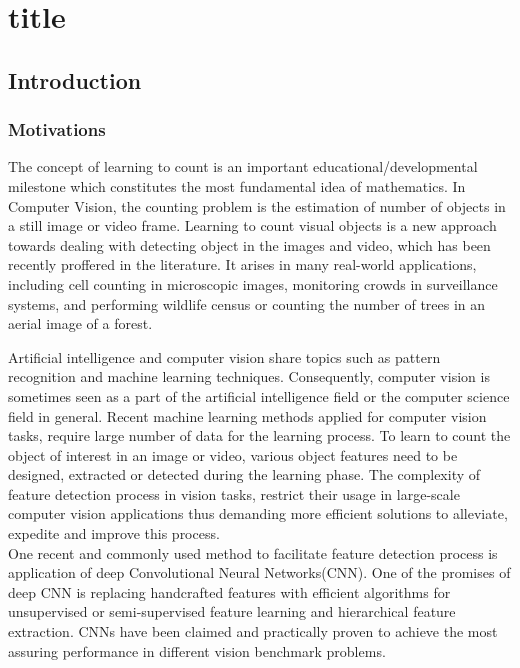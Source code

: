 \part{title}\chapter{Introduction}
\label{sec:introduction}
\section{Motivations}
The concept of learning to count is an important educational/developmental milestone  which constitutes the most fundamental idea of mathematics. In Computer Vision\cite{umbaugh1997computer}, the counting problem is the estimation of number of objects in a still image or video frame. Learning to count visual objects is a new approach towards dealing with detecting object in the images and video, which has been recently proffered in the literature\cite{viola2005detecting, rabaud2006counting, kong2005counting, chan2008privacy, segui2015learning}. It arises in many real-world applications, including cell counting in microscopic images\cite{flaccavento2011learning}, monitoring crowds in surveillance systems\cite{rahmalan2006crowd, valera2005intelligent}, and performing wildlife census or counting the number of trees in an aerial image of a forest\cite{brandtberg1998automated, pollock1996automatic}\cite{NIPS2010_4043}. 

Artificial intelligence and computer vision share topics such as pattern recognition and machine learning\cite{michalski2013machine, mitchell1997machine} techniques. Consequently, computer vision is sometimes seen as a part of the artificial intelligence field or the computer science field in general. Recent machine learning methods applied for computer vision tasks, require large number of data for the learning process. To learn to count the object of interest in an image or video, various object features need to be designed, extracted or detected during the learning phase. The complexity of feature detection process in vision tasks, restrict their usage in large-scale computer vision applications thus demanding more efficient solutions to alleviate, expedite and improve this process. \\
\indent One recent and commonly used method to facilitate feature detection process is application of deep Convolutional Neural Networks(CNN)\cite{szegedy2015going, krizhevsky2012imagenet, lecun1995convolutional, sermanet2013overfeat, ji20133d, taylor2010convolutional}. One of the promises of deep CNN is replacing handcrafted features with efficient algorithms for unsupervised or semi-supervised feature learning and hierarchical feature extraction\cite{song2013hierarchical}. CNNs have been claimed and practically proven to achieve the most assuring performance in different vision benchmark problems\cite{ciresan2011flexible, szegedy2015going, ciresan2012multi}. 

